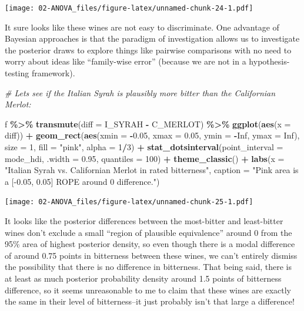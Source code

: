 \documentclass[
]{book}
\newenvironment{Shaded}{\begin{snugshade}}{\end{snugshade}}
\newcommand{\AttributeTok}[1]{\textcolor[rgb]{0.13,0.29,0.53}{#1}}
\newcommand{\CommentTok}[1]{\textcolor[rgb]{0.56,0.35,0.01}{\textit{#1}}}
\newcommand{\ConstantTok}[1]{\textcolor[rgb]{0.56,0.35,0.01}{#1}}
\newcommand{\DecValTok}[1]{\textcolor[rgb]{0.00,0.00,0.81}{#1}}
\newcommand{\FloatTok}[1]{\textcolor[rgb]{0.00,0.00,0.81}{#1}}
\newcommand{\FunctionTok}[1]{\textcolor[rgb]{0.13,0.29,0.53}{\textbf{#1}}}
\newcommand{\NormalTok}[1]{#1}
\newcommand{\SpecialCharTok}[1]{\textcolor[rgb]{0.81,0.36,0.00}{\textbf{#1}}}
\newcommand{\StringTok}[1]{\textcolor[rgb]{0.31,0.60,0.02}{#1}}
\begin{document}
\texttt{[image: 02-ANOVA\_files/figure-latex/unnamed-chunk-24-1.pdf]}

It sure looks like these wines are not easy to discriminate. One advantage of Bayesian approaches is that the paradigm of investigation allows us to investigate the posterior draws to explore things like pairwise comparisons with no need to worry about ideas like ``family-wise error'' (because we are not in a hypothesis-testing framework).

\begin{Shaded}
\begin{Highlighting}[]
\CommentTok{\# Let\textquotesingle{}s see if the Italian Syrah is plausibly more bitter than the Californian Merlot:}

\NormalTok{f }\SpecialCharTok{\%\textgreater{}\%}
  \FunctionTok{transmute}\NormalTok{(}\AttributeTok{diff =}\NormalTok{ I\_SYRAH }\SpecialCharTok{{-}}\NormalTok{ C\_MERLOT) }\SpecialCharTok{\%\textgreater{}\%}
  \FunctionTok{ggplot}\NormalTok{(}\FunctionTok{aes}\NormalTok{(}\AttributeTok{x =}\NormalTok{ diff)) }\SpecialCharTok{+} 
  \FunctionTok{geom\_rect}\NormalTok{(}\FunctionTok{aes}\NormalTok{(}\AttributeTok{xmin =} \SpecialCharTok{{-}}\FloatTok{0.05}\NormalTok{, }\AttributeTok{xmax =} \FloatTok{0.05}\NormalTok{,}
                \AttributeTok{ymin =} \SpecialCharTok{{-}}\ConstantTok{Inf}\NormalTok{, }\AttributeTok{ymax =} \ConstantTok{Inf}\NormalTok{), }
            \AttributeTok{size =} \DecValTok{1}\NormalTok{, }\AttributeTok{fill =} \StringTok{"pink"}\NormalTok{, }\AttributeTok{alpha =} \DecValTok{1}\SpecialCharTok{/}\DecValTok{3}\NormalTok{) }\SpecialCharTok{+} 
  \FunctionTok{stat\_dotsinterval}\NormalTok{(}\AttributeTok{point\_interval =}\NormalTok{ mode\_hdi, }\AttributeTok{.width =} \FloatTok{0.95}\NormalTok{, }\AttributeTok{quantiles =} \DecValTok{100}\NormalTok{) }\SpecialCharTok{+} 
  \FunctionTok{theme\_classic}\NormalTok{() }\SpecialCharTok{+}
  \FunctionTok{labs}\NormalTok{(}\AttributeTok{x =} \StringTok{"Italian Syrah vs. Californian Merlot in rated bitterness"}\NormalTok{,}
       \AttributeTok{caption =} \StringTok{"Pink area is a [{-}0.05, 0.05] ROPE around 0 difference."}\NormalTok{)}
\end{Highlighting}
\end{Shaded}

\texttt{[image: 02-ANOVA\_files/figure-latex/unnamed-chunk-25-1.pdf]}

It looks like the posterior differences between the most-bitter and least-bitter wines don't exclude a small ``region of plausible equivalence'' around 0 from the 95\% area of highest posterior density, so even though there is a modal difference of around 0.75 points in bitterness between these wines, we can't entirely dismiss the possibility that there is no difference in bitterness. That being said, there is at least as much posterior probability density around 1.5 points of bitterness difference, so it seems unreasonable to me to claim that these wines are exactly the same in their level of bitterness--it just probably isn't that large a difference!
\end{document}
